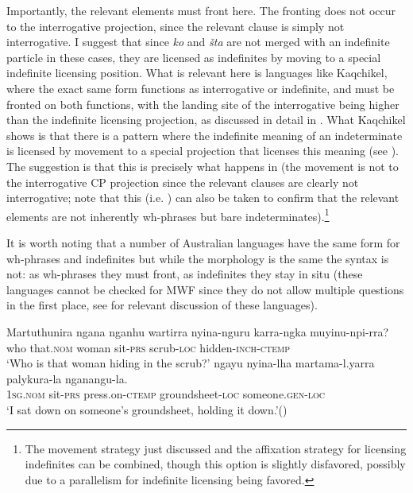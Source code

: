 \documentclass[output=paper,colorlinks,citecolor=brown]{langscibook}
\begin{document}
\noindent Importantly, the relevant elements must front here. The fronting does not occur to the interrogative projection, since the relevant clause is simply not interrogative. I suggest that since \textit{ko} and \textit{šta} are not merged with an indefinite particle in these cases, they are licensed as indefinites by moving to a special indefinite licensing position. What is relevant here is languages like Kaqchikel, where the exact same form functions as interrogative or indefinite, and must be fronted on both functions, with the landing site of the interrogative being higher than the indefinite licensing projection, as discussed in detail in \citet{Erlewine2016}. What Kaqchikel shows is that there is a pattern where the indefinite meaning of an indeterminate is licensed by movement to a special projection that licenses this meaning (see \citealt{Erlewine2016}). The suggestion is that this is precisely what happens in  (the movement is not to the interrogative CP projection since the relevant clauses are clearly not interrogative; note that this (i.e. ) can also be taken to confirm that the relevant elements are not inherently wh-phrases but bare indeterminates).\footnote{The movement strategy just discussed and the affixation strategy for licensing indefinites can be combined, though this option is slightly disfavored, possibly due to a parallelism for indefinite licensing being favored.

\z 

}

It is worth noting that a number of Australian languages have the same form for wh-phrases and indefinites but while the morphology is the same the syntax is not: as wh-phrases they must front, as indefinites they stay in situ (these languages cannot be checked for MWF since they do not allow multiple questions in the first place, see \citealt{Cheng1991} for relevant discussion of these languages).

 
\ea Martuthunira\label{ex:bosk:18}
\ea \label{ex:bosk:18a}
\gll ngana nganhu       wartirra nyina-nguru  karra-ngka    muyinu-npi-rra?\\                
who   that.\textsc{nom}  woman  sit-\textsc{prs}       scrub-\textsc{loc}   hidden-\textsc{inch}-\textsc{ctemp}\\%
\glt `Who is that woman hiding in the scrub?'
\ex \label{ex:bosk:18b}
\gll ngayu nyina-lha martama-l.yarra palykura-la nganangu-la.\\
\textsc{1sg.nom} sit-\textsc{prs} press.on-\textsc{ctemp} groundsheet-\textsc{loc} someone.\textsc{gen}-\textsc{loc}\\
\glt `I sat down on someone's groundsheet, holding it down.'\hfill (\citealt{Dench1987})
\z 
\z 
\end{document}
